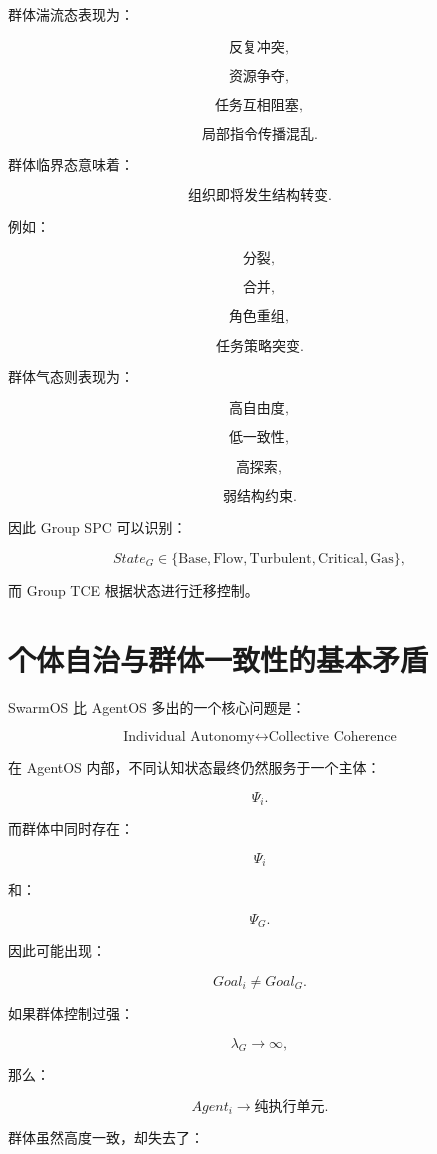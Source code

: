 群体湍流态表现为：

\[
\text{反复冲突},
\]

\[
\text{资源争夺},
\]

\[
\text{任务互相阻塞},
\]

\[
\text{局部指令传播混乱}.
\]

群体临界态意味着：

\[
\text{组织即将发生结构转变}.
\]

例如：

\[
\text{分裂},
\]

\[
\text{合并},
\]

\[
\text{角色重组},
\]

\[
\text{任务策略突变}.
\]

群体气态则表现为：

\[
\text{高自由度},
\]

\[
\text{低一致性},
\]

\[
\text{高探索},
\]

\[
\text{弱结构约束}.
\]

因此 Group SPC 可以识别：

\[
State_G
\in
\{
\text{Base},
\text{Flow},
\text{Turbulent},
\text{Critical},
\text{Gas}
\},
\]

而 Group TCE 根据状态进行迁移控制。


\section{个体自治与群体一致性的基本矛盾}

SwarmOS 比 AgentOS 多出的一个核心问题是：

\[
\boxed{
\text{Individual Autonomy}
\leftrightarrow
\text{Collective Coherence}
}
\]

在 AgentOS 内部，不同认知状态最终仍然服务于一个主体：

\[
\Psi_i.
\]

而群体中同时存在：

\[
\Psi_i
\]

和：

\[
\Psi_G.
\]

因此可能出现：

\[
Goal_i
\neq
Goal_G.
\]

如果群体控制过强：

\[
\lambda_G
\rightarrow
\infty,
\]

那么：

\[
Agent_i
\rightarrow
\text{纯执行单元}.
\]

群体虽然高度一致，却失去了：

